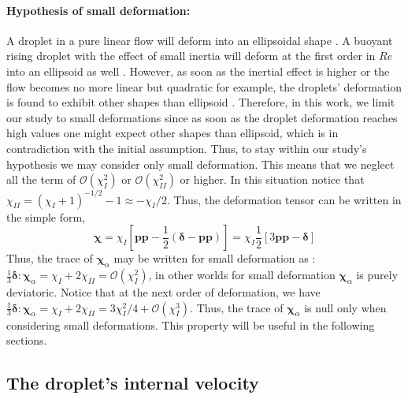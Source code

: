     
\paragraph*{Hypothesis of small deformation: }
A droplet in a pure linear flow will deform into an ellipsoidal shape \citet{leal2007advanced}. 
A buoyant rising droplet with the effect of small inertia will deform at the first order in $Re$ into an ellipsoid as well \citep{taylor1964deformation}.
However, as soon as the inertial effect is higher or the flow becomes no more linear but quadratic for example, the droplets' deformation is found to exhibit other shapes than ellipsoid \citet{taylor1964deformation,stone1990simple}.
Therefore, in this work, we limit our study to small deformations since as soon as the droplet deformation reaches high values one might expect other shapes than ellipsoid, which is in contradiction with the initial assumption. 
Thus, to stay within our study's hypothesis we may consider only small deformation. 
This means that we neglect all the term of $\mathcal{O}(\chi_I^2)$ or $\mathcal{O}(\chi_{II}^2)$ or higher. 
In this situation notice that $\chi_{II} = (\chi_I + 1)^{-1/2} -1 \approx  - \chi_I /2$. 
Thus, the deformation tensor can be written in the simple form, 
\begin{equation}
    \bm\chi 
    = \chi_I
    \left[
        \textbf{pp} 
        - \frac{1}{2}(\bm\delta - \textbf{pp})
    \right]
    = \chi_I \frac{1}{2} \left[
        3 \textbf{pp} - \bm\delta
    \right]
    \label{eq:chi_I_small_def}
\end{equation}
Thus, the trace of $\bm\chi_\alpha$ may be written for small deformation as :  $\frac{1}{3}\bm\delta:\bm\chi_\alpha  = \chi_I + 2\chi_{II} = \mathcal{O}(\chi_{I}^2)$, in other worlds for small deformation $\bm\chi_\alpha$ is purely deviatoric. 
Notice that at the next order of deformation, we have $\frac{1}{3}\bm\delta:\bm\chi_\alpha  = \chi_I + 2\chi_{II} = 3 \chi_I^2 /4 +  \mathcal{O}(\chi_{I}^3)$. 
Thus, the trace of $\bm\chi_\alpha$ is null only when considering small deformations. 
This property will be useful in the following sections.

\subsection{The droplet's internal velocity}

